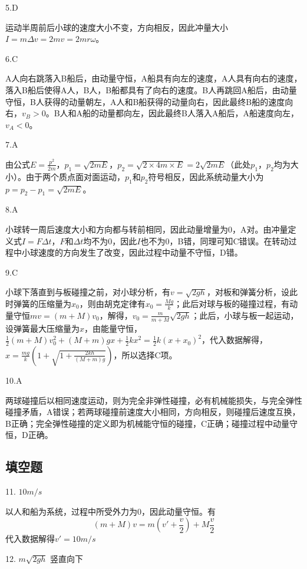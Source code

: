 \documentclass[blue, pad]{./templete/qyxfnote}
\begin{document}
			5.D
			
			运动半周前后小球的速度大小不变，方向相反，因此冲量大小\(I=m\Delta v=2mv=2mr \omega\)。
			
			6.C
			
			A人向右跳落入B船后，由动量守恒，A船具有向左的速度，A人具有向右的速度，落入B船后使得A人，B人，B船都具有了向右的速度。B人再跳回A船后，由动量守恒，B人获得的动量朝左，A人和B船获得的动量向右，因此最终B船的速度向右，\(v_B>0\)。B人和A船的动量都向左，因此最终B人落入A船后，A船速度向左，\(v_A<0\)。
			
			7.A
			
			由公式\(E=\frac{p^2}{2m}\)，\(p_1=\sqrt{2mE}\)，\(p_2=\sqrt{2\times 4m\times E}=2\sqrt{2mE}\)（此处\(p_1\)，\(p_2\)均为大小）。由于两个质点面对面运动，\(p_1\)和\(p_2\)符号相反，因此系统动量大小为\(p=p_2-p_1=\sqrt{2mE}\)。
			
			8.A
			
			小球转一周后速度大小和方向都与转前相同，因此动量增量为0，A对。由冲量定义式\(I=F\Delta t\)，\(F\)和\(\Delta t\)均不为0，因此\(I\)也不为0，B错，同理可知C错误。在转动过程中小球速度的方向发生了改变，因此过程中动量不守恒，D错。
			
			9.C
			
			小球下落直到与板碰撞之前，对小球分析，有\(v=\sqrt{2gh}\)，对板和弹簧分析，设此时弹簧的压缩量为\(x_0\)，则由胡克定律有\(x_0=\frac{Mg}{k}\)；此后对球与板的碰撞过程，有动量守恒\(mv=(m+M)v_0\)，解得，\(v_0=\frac{m}{m+M}\sqrt{2gh}\)；此后，小球与板一起运动，设弹簧最大压缩量为\(x\)，由能量守恒，\(\frac{1}{2}(m+M)v_0^2+(M+m)gx+\frac{1}{2}kx^2=\frac{1}{2}k(x+x_0)^2\)，代入数据解得，\(x=\frac{mg}{k}(1+\sqrt{1+\frac{2kh}{(M+m)g}})\)，所以选择C项。
			
			10.A
			
			两球碰撞后以相同速度运动，则为完全非弹性碰撞，必有机械能损失，与完全弹性碰撞矛盾，A错误；若两球碰撞前速度大小相同，方向相反，则碰撞后速度互换，B正确；完全弹性碰撞的定义即为机械能守恒的碰撞，C正确；碰撞过程中动量守恒，D正确。
		\subsection{填空题}
			11. $10m/s$
			
			以人和船为系统，过程中所受外力为$ 0 $，因此动量守恒。有
			\begin{equation*}
			(m+M)v=m(v'+\frac{v}{2})+M\frac{v}{2} 
			\end{equation*}
			代入数据解得$ v'=10m/s $
			
			12. $ m\sqrt{2gh} $ \hspace{4em} 竖直向下
			
\end{document}
